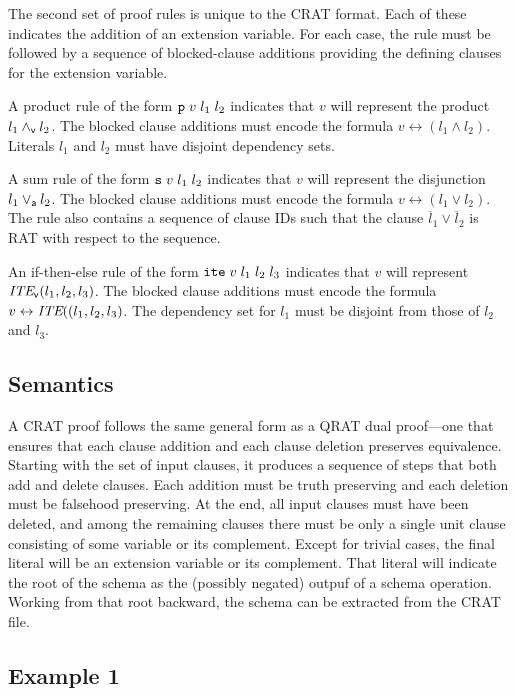 \documentclass{llncs}
\newcommand{\pand}{\mathbin{\land_{\sf v}}}
\newcommand{\por}{\mathbin{\lor_{\sf a}}}
\newcommand{\obar}[1]{\overline{#1}}
\newcommand{\ite}{\mbox{\it ITE}}
\newcommand{\pite}{\mbox{\it ITE}_{\sf v}}
\begin{document}
The second set of proof rules is unique to the CRAT format.  Each of
these indicates the addition of an extension variable.  For each case,
the rule must be followed by a sequence of blocked-clause additions
providing the defining clauses for the extension variable.

A product rule of the form ${\tt p}\;v\;l_1\;l_2$ indicates that $v$
will represent the product $l_1 \pand l_2$.  The blocked clause
additions must encode the formula $v \leftrightarrow (l_1 \land l_2)$.
Literals $l_1$ and $l_2$ must have disjoint dependency sets.

A sum rule of the form ${\tt s}\;v\;l_1\;l_2$ indicates that $v$ will
represent the disjunction $l_1 \por l_2$.  The blocked clause
additions must encode the formula $v \leftrightarrow (l_1 \lor l_2)$.
The rule also contains a sequence of clause IDs such that the clause
$\obar{l}_1 \lor \obar{l}_2$ is RAT with respect to the sequence.

An if-then-else rule of the form ${\tt ite}\;v\;l_1\;l_2\;l_3$
indicates that $v$ will represent $\pite(l_1, l_2, l_3)$.  The blocked
clause additions must encode the formula
$v \leftrightarrow \ite((l_1,l_2, l_3)$.
The dependency set for $l_1$ must be disjoint from those
of $l_2$ and $l_3$.


\subsection{Semantics}

A CRAT proof follows the same general form as a QRAT dual proof---one
that ensures that each clause addition and each clause deletion
preserves equivalence.  Starting with the set of input clauses, it
produces a sequence of steps that both add and delete clauses.  Each
addition must be truth preserving and each deletion must be falsehood
preserving.  At the end, all input clauses must have been deleted, and
among the remaining clauses there must be only a single unit clause
consisting of some variable or its complement.  Except for trivial
cases, the final literal will be an extension variable or its
complement.  That literal will indicate the root of the schema as the
(possibly negated) outpuf of a schema operation.  Working from that
root backward, the schema can be extracted from the CRAT file.

\subsection{Example 1}
\end{document}
